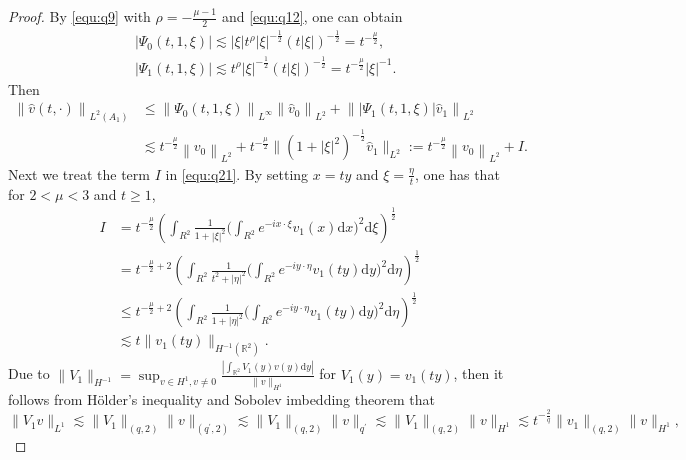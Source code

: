 \documentclass[11pt,twoside]{article}
\newcommand{\R}{\mathbb R}
\newcommand{\f}{\frac}
\theoremstyle{plain}
\theoremstyle{definition}
\theoremstyle{remark}
\numberwithin{equation}{section}
\begin{document}
\begin{proof}
By \eqref{equ:q9} with $\rho=-\f{\mu-1}{2}$ and \eqref{equ:q12}, one can obtain
\begin{equation}\label{equ:q20}
\begin{aligned}
& \left|\Psi_0(t, 1,\xi)\right| \lesssim|\xi| t^\rho|\xi|^{-\frac{1}{2}}(t|\xi|)^{-\frac{1}{2}}=t^{-\frac{\mu}{2}}, \\
& \left|\Psi_1(t, 1, \xi)\right|  \lesssim t^\rho|\xi|^{-\frac{1}{2}}(t|\xi|)^{-\frac{1}{2}}=t^{-\frac{\mu}{2}}|\xi|^{-1}.
\end{aligned}
\end{equation}
Then
\begin{equation}\label{equ:q21}
\begin{aligned}
\left\|\hat{v}(t, \cdot)\right\|_{L^2(A_1)} & \leq\left\|  \Psi_{0}(t, 1, \xi)\right\|_{L^{\infty}}\left\|\hat{v}_{0}\right\|_{L^{2}}+\left\||\Psi_{1 }(t, 1, \xi)|\hat{v}_{1}\right\|_{L^{2}} \\
& \lesssim t^{-\frac{\mu}{2}}\left\|v_{0}\right\|_{L^{2}}+t^{-\f{\mu}{2}} \|(1+|\xi|^2)^{-\f{1}{2}}\hat{v}_{1}\|_{L^{2}}
:= t^{-\frac{\mu}{2}}\left\|v_{0}\right\|_{L^{2}}+ I.
\end{aligned}
\end{equation}
Next we treat the term $I$ in \eqref{equ:q21}.  By setting $x=ty$ and $\xi=\f{\eta}{t}$, one has that for $2<\mu<3$ and $t\geq1$,
\begin{equation}\label{equ:q22}
\begin{aligned}
I & =t^{-\f{\mu}{2}} \left(\int_{R^2} \frac{1}{1+|\xi|^2}\big(\int_{R^2} e^{-i x \cdot \xi} v_1(x) \mathrm{d} x\big)^2 \mathrm{d}\xi\right)^{\frac{1}{2}}\\
& =t^{-\f{\mu}{2}+2}\left(\int_{R^2} \frac{1}{t^2+|\eta|^2}\big(\int_{R^2} e^{-i y \cdot \eta} v_1(ty) \mathrm{d} y\big)^2 \mathrm{d} \eta\right)^{\frac{1}{2}}\\
& \leq t^{-\f{\mu}{2}+2}\left(\int_{R^2} \frac{1}{1+|\eta|^2}\big(\int_{R^2} e^{-i y \cdot \eta} v_1(ty) \mathrm{d} y\big)^2 \mathrm{d} \eta\right)^{\frac{1}{2}}\\
& \lesssim t\|v_1(ty)\|_{H^{-1}(\R^2)}.
\end{aligned}
\end{equation}
Due to $\|V_1\|_{H^{-1}}=\sup _{v \in H^1, v \neq 0} \frac{\left|\int_{\mathbb{R}^2} V_1(y) v(y) \mathrm{d} y\right|}{\|v\|_{H^1}}$
for $V_1(y)=v_1(ty)$, then it follows from H\"{o}lder's inequality and Sobolev imbedding theorem that
\begin{equation}\label{equ:q23}
\|V_1 v\|_{L^1} \lesssim\|V_1\|_{(q, 2)}\|v\|_{\left(q^{\prime}, 2\right)} \lesssim\|V_1\|_{(q, 2)}\|v\|_{q^{\prime}} \lesssim\|V_1\|_{(q, 2)}\|v\|_{H^1}\lesssim t^{-\f{2}{q}}\|v_1\|_{(q, 2)}\|v\|_{H^1},

\end{equation}
\end{proof}
\end{document}
